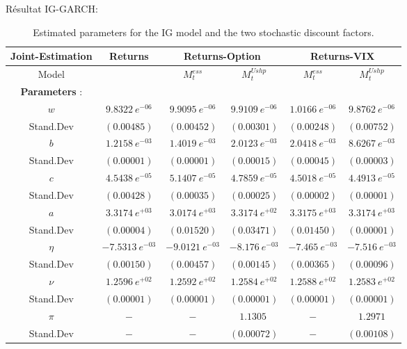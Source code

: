 \documentclass[preprint,times,12pt]{elsarticle}
\begin{document}
\newpage
R\'esultat IG-GARCH:

\begin{table}[h]
\centering
\caption{\textcolor[rgb]{0,0,0}{Estimated parameters for the IG model and the two stochastic discount factors.}} 
{\begin{tabular}{@{}cccccc@{}} \toprule
Joint-Estimation            & Returns & \multicolumn{2}{c}{Returns-Option} & \multicolumn{2}{c}{Returns-VIX} \\\midrule
Model               & &$ M^{ess}_{t}$   & $ M^{Ushp}_{t}$     & $ M^{ess}_{t}$    & $ M^{Ushp}_{t}$   \\ \hline
\textbf{Parameters} : &  && & & \\ [0.1cm] 
\textbf{$ w $}      &$ 9.8322 \ e^{-06}$ &$9.9095 \ e^{-06}$ &$9.9109\ e^{-06}$ &$ 1.0166\ e^{-06}$ &$ 9.8762\ e^{-06}$\\ 
Stand.Dev           &$(0.00485)$ &$(0.00452)$ &$(0.00301)$&$(0.00248)$  &$(0.00752)$\\ 
\textbf{$ b $}  & $1.2158 \ e^{-03}$  &$1.4019 \ e^{-03}$ &$2.0123\ e^{-03}$&$2.0418\ e^{-03}$ &$8.6267\ e^{-03}$\\[0.07cm]
Stand.Dev           &$(0.00001)$ &$(0.00001)$ &$(0.00015)$&$(0.00045)$  &$(0.00003)$\\ 
\textbf{$ c $}     & $4.5438  \ e^{-05}$ &$5.1407  \ e^{-05}$ & $4.7859\ e^{-05}$&$ 4.5018 \ e^{-05}$ &$4.4913 \ e^{-05}$\\ 
Stand.Dev           &$(0.00428)$ &$(0.00035)$ &$(0.00025)$&$(0.00002)$  &$(0.00001)$\\ 
\textbf{$ a $}     &$3.3174 \ e^{+03}$&$3.0174 \ e^{+03}$ &$3.3174\ e^{+02}$&$ 3.3175 \ e^{+03}$ &$3.3174 \ e^{+03 }$\\ 
Stand.Dev           &$(0.00004)$ &$(0.01520)$ &$(0.03471)$&$(0.01450)$  &$(0.00001)$\\ 
\textbf{$\eta$}    &$-7.5313 \ e^{-03}$&$-9.0121\ e^{-03}$&$-8.176  \ e^{-03}$&$-7.465\ e^{-03}$ &$-7.516 \ e^{-03}$\\ 
Stand.Dev           &$(0.00150)$ &$(0.00457)$ &$(0.00145)$&$(0.00365)$  &$(0.00096)$\\ 
\textbf{$ \nu $}   &$1.2596 \ e^{+02}$&$1.2592 \ e^{+02}$ &$1.2584 \ e^{+02}$ &$1.2588 \ e^{+02}$ &$1.2583\ e^{+02}$\\
Stand.Dev           &$(0.00001)$ &$(0.00001)$ &$(0.00001)$&$(0.00001)$  &$(0.00001)$\\ 
\textbf{$\pi$}     & $-$ &$-$ &$1.1305 \ $ &  $-$           &$1.2971 $\\ 
Stand.Dev          &$-$  &$-$ &$(0.00072)$&$-$  &$(0.00108)$\\ 

\end{tabular}}
\end{table}
\end{document}
